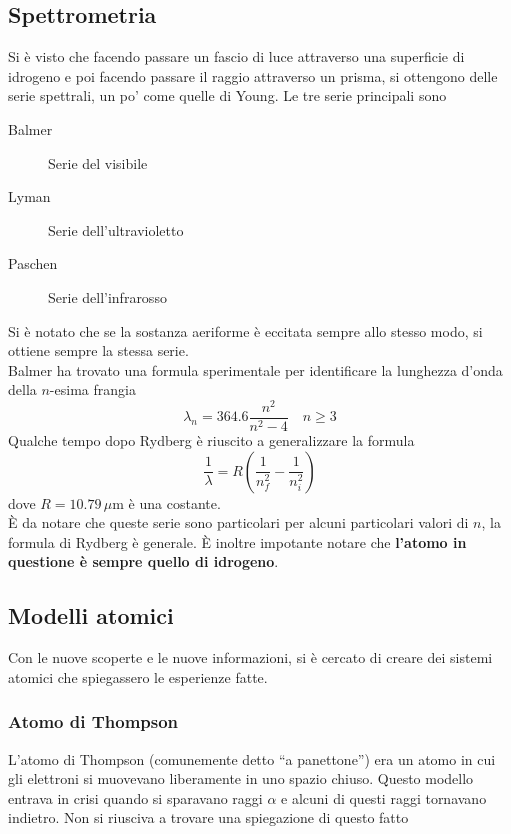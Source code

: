 \subsection{Spettrometria}
Si è visto che facendo passare un fascio di luce attraverso una superficie di idrogeno e poi facendo
passare il raggio attraverso un prisma, si ottengono delle serie spettrali, un po' come quelle di 
Young. Le tre serie principali sono
\begin{description}
  \item[Balmer] Serie del visibile
  \item[Lyman] Serie dell'ultravioletto
  \item[Paschen] Serie dell'infrarosso
\end{description}
Si è notato che se la sostanza aeriforme è eccitata sempre allo stesso modo, si ottiene sempre la
stessa serie.\\
Balmer ha trovato una formula sperimentale per identificare la lunghezza d'onda della $n$-esima 
frangia
\begin{equation*}
  \lambda_n = 364.6 \frac{n^2}{n^2-4}\quad n\geq3
\end{equation*}
Qualche tempo dopo Rydberg è riuscito a generalizzare la formula
\begin{equation*}
  \frac{1}{\lambda}=R \left( \frac{1}{n^2_f}-\frac{1}{n^2_i} \right)
\end{equation*}
dove $R=10.79\,\mu\text{m}$ è una costante.\\
È da notare che queste serie sono particolari per alcuni particolari valori di $n$, la formula di
Rydberg è generale. È inoltre impotante notare che \textbf{l'atomo in questione è sempre quello di
idrogeno}.

\subsection{Modelli atomici}
Con le nuove scoperte e le nuove informazioni, si è cercato di creare dei sistemi atomici che 
spiegassero le esperienze fatte.
\subsubsection{Atomo di Thompson}
L'atomo di Thompson (comunemente detto ``a panettone'') era un atomo in cui gli elettroni si 
muovevano liberamente in uno spazio chiuso. Questo modello entrava in crisi quando si sparavano raggi
$\alpha$ e alcuni di questi raggi tornavano indietro. Non si riusciva a trovare una spiegazione di
questo fatto
